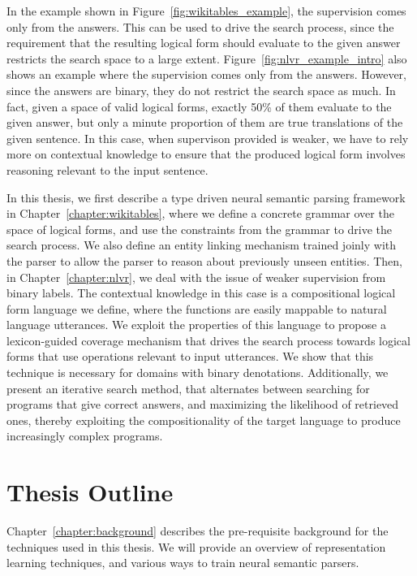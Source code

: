 In the example shown in Figure~\ref{fig:wikitables_example}, the supervision comes only from the answers. This can be used to drive the search process, since the
requirement that the resulting logical form should evaluate to the given answer restricts the search space to a large extent.
Figure~\ref{fig:nlvr_example_intro} also shows an example where the supervision comes only from the answers. However, since the answers are binary, they do not restrict the
search space as much. In fact, given a space of valid logical forms, exactly 50\% of them evaluate to the given answer, but only a minute proportion of them are true translations
of the given sentence. In this case, when supervison provided is weaker, we have to rely more on contextual knowledge to ensure that the produced logical form involves reasoning
relevant to the input sentence.

In this thesis, we first describe a type driven neural semantic parsing framework in Chapter~\ref{chapter:wikitables}, where we define a concrete grammar over the space
of logical forms, and use the constraints from the grammar to drive the search process. We also
define an entity linking mechanism trained joinly with the parser to allow the parser to reason about
previously unseen entities. Then, in Chapter~\ref{chapter:nlvr}, we deal with the issue of weaker supervision from binary labels. The contextual knowledge
in this case is a compositional logical form language we define, where the functions are easily mappable to natural language utterances. We exploit the properties of this language to
propose a lexicon-guided coverage mechanism that drives the search process towards logical forms that use operations relevant to input utterances.
We show that this technique is necessary for domains with binary denotations. Additionally, we present an iterative search method, that alternates between searching
for programs that give correct answers, and maximizing the likelihood of retrieved ones, thereby exploiting the compositionality of the target language to produce increasingly complex programs. 

\section{Thesis Outline}

Chapter~\ref{chapter:background} describes the pre-requisite background for the techniques used in this thesis. We will provide an overview of representation learning techniques, and various ways to train neural semantic parsers.

